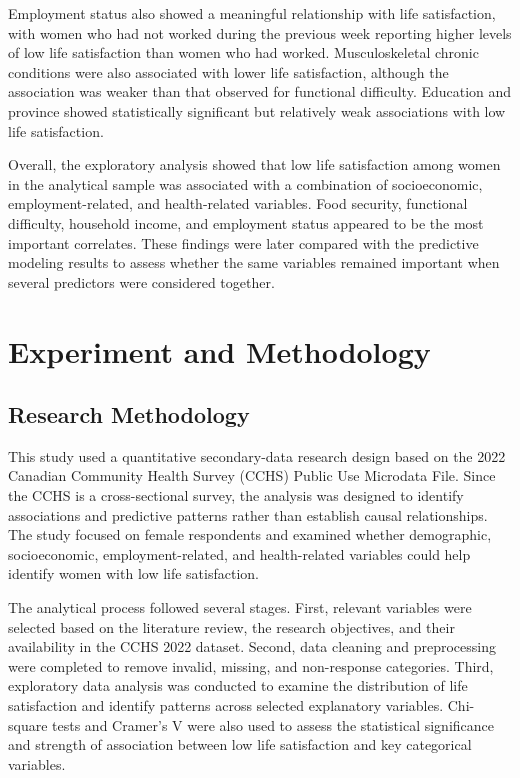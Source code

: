 \documentclass[12pt]{article}
\begin{document}
Employment status also showed a meaningful relationship with life satisfaction, with women who had not worked during the previous week reporting higher levels of low life satisfaction than women who had worked. Musculoskeletal chronic conditions were also associated with lower life satisfaction, although the association was weaker than that observed for functional difficulty. Education and province showed statistically significant but relatively weak associations with low life satisfaction.

Overall, the exploratory analysis showed that low life satisfaction among women in the analytical sample was associated with a combination of socioeconomic, employment-related, and health-related variables. Food security, functional difficulty, household income, and employment status appeared to be the most important correlates. These findings were later compared with the predictive modeling results to assess whether the same variables remained important when several predictors were considered together.


\section{Experiment and Methodology}

\subsection{Research Methodology}

This study used a quantitative secondary-data research design based on the 2022 Canadian Community Health Survey (CCHS) Public Use Microdata File. Since the CCHS is a cross-sectional survey, the analysis was designed to identify associations and predictive patterns rather than establish causal relationships. The study focused on female respondents and examined whether demographic, socioeconomic, employment-related, and health-related variables could help identify women with low life satisfaction.

The analytical process followed several stages. First, relevant variables were selected based on the literature review, the research objectives, and their availability in the CCHS 2022 dataset. Second, data cleaning and preprocessing were completed to remove invalid, missing, and non-response categories. Third, exploratory data analysis was conducted to examine the distribution of life satisfaction and identify patterns across selected explanatory variables. Chi-square tests and Cramer's V were also used to assess the statistical significance and strength of association between low life satisfaction and key categorical variables.
\end{document}
